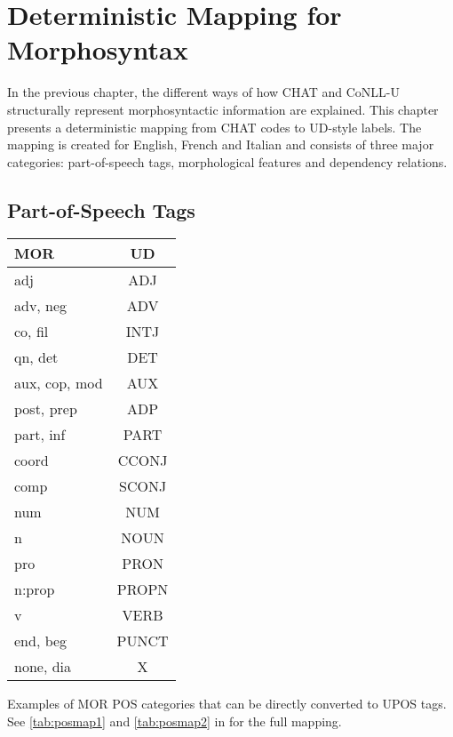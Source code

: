 \chapter{Deterministic Mapping for Morphosyntax} %
\label{Chapter7} %

In the previous chapter, the different ways of how CHAT and CoNLL-U structurally represent morphosyntactic information are explained. This chapter presents a deterministic mapping from CHAT codes to UD-style labels. The mapping is created for English, French and Italian and consists of three major categories: part-of-speech tags, morphological features and dependency relations.


\section{Part-of-Speech Tags}
\label{sec:pos}
\begin{margintable}[1\baselineskip] %
\begin{tabularx}{\textwidth}{@{}Lc@{}}
\toprule
\textbf{MOR} & \textbf{UD}\\ \midrule
adj & ADJ\\
adv, neg & ADV\\
co, fil & INTJ\\
qn, det & DET\\
aux, cop, mod & AUX\\
post, prep & ADP\\
part, inf & PART\\
coord & CCONJ\\
comp & SCONJ\\
num & NUM\\
n & NOUN\\
pro & PRON\\
n:prop & PROPN\\
v & VERB\\
end, beg & PUNCT\\
none, dia & X\\\bottomrule
\end{tabularx}
\caption{\label{tab:martabpos}Examples of MOR POS categories that can be directly converted to UPOS tags. See \ref{tab:posmap1} and \ref{tab:posmap2} in  for the full mapping.}
\footnotesize
\end{margintable}


